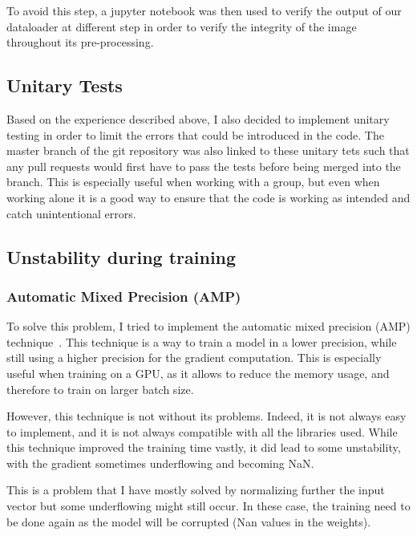 \documentclass[11pt]{article}
\begin{document}
        To avoid this step, a jupyter notebook was then used to verify the output of our dataloader at different step in order to verify the integrity of the image
        throughout its pre-processing.

    \subsection{Unitary Tests}

            Based on the experience described above, I also decided to implement unitary testing in order to limit the errors
            that could be introduced in the code. The master branch of the git repository was also linked to these unitary tets such that
            any pull requests would first have to pass the tests before being merged into the branch. This is especially useful when working with a group,
            but even when working alone it is a good way to ensure that the code is working as intended and catch unintentional errors.


    \subsection{Unstability during training}

    \subsubsection{Automatic Mixed Precision (AMP)}

            To solve this problem, I tried to implement the automatic mixed precision (AMP) technique~\cite{automatic_mixed_precision}. This technique is a way to train a model in a lower precision, while still using a higher precision for the gradient computation.
            This is especially useful when training on a GPU, as it allows to reduce the memory usage, and therefore to train on larger batch size.

            However, this technique is not without its problems. Indeed, it is not always easy to implement, and it is not always compatible with all the libraries used.
            While this technique improved the training time vastly, it did lead to some unstability, with the gradient sometimes underflowing and becoming NaN.

            This is a problem that I have mostly solved by normalizing further the input vector but some underflowing might still occur. In these case, the training need to be done
            again as the model will be corrupted (Nan values in the weights).
\end{document}
